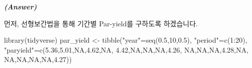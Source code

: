 \documentclass[
  letterpaper,
  DIV=11,
  numbers=noendperiod]{scrreprt}
\newenvironment{Shaded}{\begin{snugshade}}{\end{snugshade}}
\newcommand{\ConstantTok}[1]{\textcolor[rgb]{0.56,0.35,0.01}{#1}}
\newcommand{\DecValTok}[1]{\textcolor[rgb]{0.68,0.00,0.00}{#1}}
\newcommand{\FloatTok}[1]{\textcolor[rgb]{0.68,0.00,0.00}{#1}}
\newcommand{\FunctionTok}[1]{\textcolor[rgb]{0.28,0.35,0.67}{#1}}
\newcommand{\NormalTok}[1]{\textcolor[rgb]{0.00,0.23,0.31}{#1}}
\newcommand{\OtherTok}[1]{\textcolor[rgb]{0.00,0.23,0.31}{#1}}
\newcommand{\SpecialCharTok}[1]{\textcolor[rgb]{0.37,0.37,0.37}{#1}}
\newcommand{\StringTok}[1]{\textcolor[rgb]{0.13,0.47,0.30}{#1}}
\begin{document}
\textbf{\emph{(Answer)}}

먼저, 선형보간법을 통해 기간별 Par-yield를 구하도록 하겠습니다.

\begin{Shaded}
\begin{Highlighting}[]
\FunctionTok{library}\NormalTok{(tidyverse)}
\NormalTok{par\_yield }\OtherTok{\textless{}{-}} \FunctionTok{tibble}\NormalTok{(}\StringTok{"year"}\OtherTok{=}\FunctionTok{seq}\NormalTok{(}\FloatTok{0.5}\NormalTok{,}\DecValTok{10}\NormalTok{,}\FloatTok{0.5}\NormalTok{),}
                    \StringTok{"period"}\OtherTok{=}\FunctionTok{c}\NormalTok{(}\DecValTok{1}\SpecialCharTok{:}\DecValTok{20}\NormalTok{),}
                    \StringTok{"paryield"}\OtherTok{=}\FunctionTok{c}\NormalTok{(}\FloatTok{5.36}\NormalTok{,}\FloatTok{5.01}\NormalTok{,}\ConstantTok{NA}\NormalTok{,}\FloatTok{4.62}\NormalTok{,}\ConstantTok{NA}\NormalTok{,}
                                 \FloatTok{4.42}\NormalTok{,}\ConstantTok{NA}\NormalTok{,}\ConstantTok{NA}\NormalTok{,}\ConstantTok{NA}\NormalTok{,}\FloatTok{4.26}\NormalTok{,}
                                \ConstantTok{NA}\NormalTok{,}\ConstantTok{NA}\NormalTok{,}\ConstantTok{NA}\NormalTok{,}\FloatTok{4.28}\NormalTok{,}\ConstantTok{NA}\NormalTok{,}
                                \ConstantTok{NA}\NormalTok{,}\ConstantTok{NA}\NormalTok{,}\ConstantTok{NA}\NormalTok{,}\ConstantTok{NA}\NormalTok{,}\FloatTok{4.27}\NormalTok{))}
\end{Highlighting}
\end{Shaded}
\end{document}
